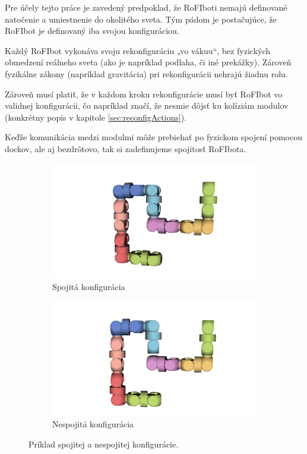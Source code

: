 \documentclass[
  digital, %
  twoside, %
  table,   %
  nolof,     %
  nolot,     %
]{fithesis3}
\begin{document}
Pre účely tejto práce je zavedený predpoklad, že RoFIboti nemajú definované natočenie a umiestnenie do okolitého sveta. Tým pádom je postačujúce, že RoFIbot je definovaný iba svojou konfiguráciou. 

Každý RoFIbot vykonáva svoju rekonfiguráciu „vo vákuu“, bez fyzických obmedzení reálneho sveta (ako je napríklad podlaha, či iné prekážky). Zároveň fyzikálne zákony (napríklad gravitácia) pri rekonfigurácii nehrajú žiadnu rolu. 

Zároveň musí platiť, že v každom kroku rekonfigurácie musí byť RoFIbot vo validnej konfigurácii, čo napríklad značí, že nesmie dôjsť ku kolíziám modulov (konkrétny popis v kapitole \ref{sec:reconfigActions}). 

Keďže komunikácia medzi modulmi môže prebiehať po fyzickom spojení pomocou dockov, ale aj bezdrôtovo, tak si zadefinujeme spojitosť RoFIbota. 

\begin{figure}[hbt!]
    \centering
    \begin{subfigure}[b]{0.49\textwidth}
        \includegraphics[width=\textwidth]{pictures/connected_rofibot.png}
        \caption[Spojitá konfigurácia.]{Spojitá konfigurácia}
        \label{fig:connectCfg}
    \end{subfigure}
    \begin{subfigure}[b]{0.49\textwidth}
        \includegraphics[width=\textwidth]{pictures/disconneted_rofibot.png}
        \caption[Nespojitá konfigurácia.]{Nespojitá konfigurácia}
        \label{fig:disconnectCfg}
    \end{subfigure}
    \caption[Príklad konfigurácie]{Príklad spojitej a nespojitej konfigurácie.}
    \label{fig:exampleCfg}
\end{figure}
\end{document}
